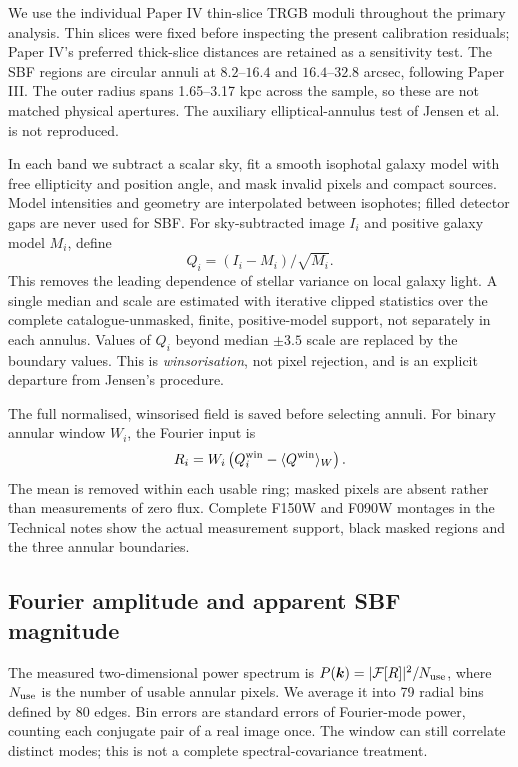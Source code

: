 \documentclass[nodoi,nocopyright]{pas}
\begin{document}
We use the individual Paper IV thin-slice TRGB moduli throughout the primary
analysis. Thin slices were fixed before inspecting the present calibration
residuals; Paper IV's preferred thick-slice distances are retained as a
sensitivity test. The SBF regions are circular annuli at
$8.2$--$16.4$ and $16.4$--$32.8$ arcsec, following Paper III.
The outer radius spans 1.65--3.17 kpc across the sample, so these are not
matched physical apertures. The auxiliary elliptical-annulus test of Jensen
et al. is not reproduced.

In each band we subtract a scalar sky, fit a smooth isophotal galaxy model
with free ellipticity and position angle, and mask invalid pixels and
compact sources. Model intensities and geometry are interpolated between
isophotes; filled detector gaps are never used for SBF. For sky-subtracted
image $I_i$ and positive galaxy model $M_i$, define
\begin{equation}
 Q_i=(I_i-M_i)/\sqrt{M_i}.
 \label{eq:normalisation}
\end{equation}
This removes the leading dependence of stellar variance on local galaxy
light. A single median and scale are estimated with iterative clipped
statistics over the complete catalogue-unmasked, finite, positive-model
support, not separately in each annulus. Values of $Q_i$ beyond
median $\pm3.5$ scale are replaced by the boundary values.
This is \emph{winsorisation}, not pixel rejection, and is an explicit
departure from Jensen's procedure.

The full normalised, winsorised field is saved before selecting annuli.
For binary annular window $W_i$, the Fourier input is
\begin{equation}
 R_i=W_i\left(Q_i^{\rm win}-\langle Q^{\rm win}\rangle_W\right).
 \label{eq:fft-input}
\end{equation}
The mean is removed within each usable ring; masked pixels are absent
rather than measurements of zero flux. Complete F150W and F090W montages
in the Technical notes show the actual measurement support, black masked
regions and the three annular boundaries.

\subsection{Fourier amplitude and apparent SBF magnitude}

The measured two-dimensional power spectrum is
$P(\boldsymbol{k})=|\mathcal F[R]|^2/N_{\rm use}$, where $N_{\rm use}$
is the number of usable annular pixels.
We average it into 79 radial bins defined by 80 edges. Bin errors are
standard errors of Fourier-mode power, counting each conjugate pair of a
real image once. The window can still correlate distinct modes; this is not
a complete spectral-covariance treatment.
\end{document}

